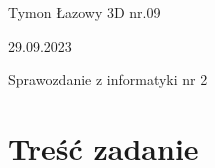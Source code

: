 \documentclass[a4paper,11pt]{article}
\begin{document}
\begin{center}
    \begin{multicols}{2}
    \begin{flushleft}
    \large{Tymon Łazowy 3D nr.09} \\
    \end{flushleft}
    
    \begin{flushright}
    \large{29.09.2023}\\
    \end{flushright}
    \end{multicols}
    {\LARGE Sprawozdanie z informatyki nr 2} \\ \vspace{0pt}
\end{center}

\section{Treść zadanie}
\end{document}
